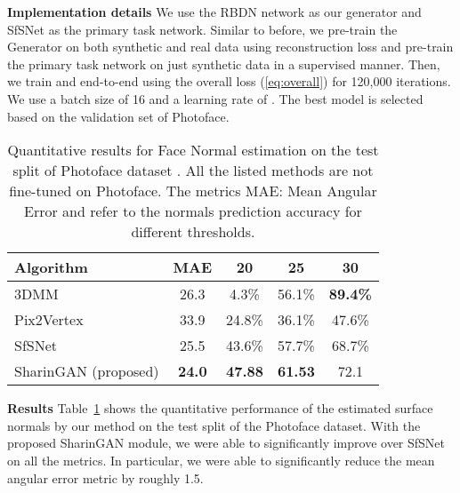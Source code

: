 \documentclass[10pt,twocolumn,letterpaper]{article}
\begin{document}
\textbf{Implementation details} We use the RBDN network \cite{Santhanam_2017_CVPR} as our generator and SfSNet \cite{SfSNet} as the primary task network. Similar to before, we pre-train the Generator on both synthetic and real data using reconstruction loss and pre-train the primary task network on just synthetic data in a supervised manner. Then, we train  and  end-to-end using the overall loss (\ref{eq:overall}) for 120,000 iterations. We use a batch size of 16 and a learning rate of . The best model is selected based on the validation set of Photoface\cite {Photoface}.
\begin{table}[h]
\begin{adjustbox}{width=\linewidth}
\begin{tabular}{|l|c|c|c|c|}
\hline
Algorithm & MAE &  20 &  25 &  30\\
\hline\hline
3DMM \cite{3DMM} & 26.3   & 4.3\% & 56.1\% & \textbf{89.4\%} \\
Pix2Vertex \cite{Sela_2017_ICCV} & 33.9 & 24.8\% & 36.1\% & 47.6\% \\
SfSNet\cite{SfSNet} & 25.5 & 43.6\% & 57.7\% & 68.7\% \\
SharinGAN (proposed)& \textbf{24.0} & \textbf{47.88}& \textbf{61.53}& 72.1\\
\hline
\end{tabular}
\end{adjustbox}
\caption{Quantitative results for Face Normal estimation on the test split of Photoface dataset \cite{Photoface}. All the listed methods are not fine-tuned on Photoface. The metrics MAE: Mean Angular Error and  refer to the normals prediction accuracy for different thresholds.}
\vspace{-3mm}
\label{table:sn_results}
\end{table}

\textbf{Results} Table~\ref{table:sn_results} shows the quantitative performance of the estimated surface normals by our method on the test split of the Photoface dataset. 
With the proposed SharinGAN module, we were able to significantly improve over SfSNet on all the metrics.
In particular, we were able to significantly reduce the mean angular error metric by roughly 1.5.
\end{document}
